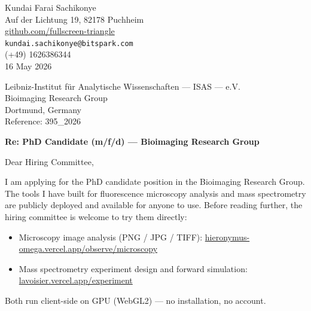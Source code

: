 \documentclass[12pt,a4paper]{article}
\begin{document}
\begin{flushright}
Kundai Farai Sachikonye \\
Auf der Lichtung 19, 82178 Puchheim \\
\href{https://github.com/fullscreen-triangle}{github.com/fullscreen-triangle} \\
\texttt{kundai.sachikonye@bitspark.com} \\
(+49) 1626386344 \\[6pt]
16 May 2026
\end{flushright}

\vspace{1em}

Leibniz-Institut für Analytische Wissenschaften --- ISAS --- e.V. \\
Bioimaging Research Group \\
Dortmund, Germany \\
Reference: 395\_2026

\vspace{1.5em}

\textbf{Re: PhD Candidate (m/f/d) --- Bioimaging Research Group}

\vspace{1em}

Dear Hiring Committee,

I am applying for the PhD candidate position in the Bioimaging Research Group.
The tools I have built for fluorescence microscopy analysis and mass spectrometry
are publicly deployed and available for anyone to use. Before reading further,
the hiring committee is welcome to try them directly:

\begin{itemize}
  \item Microscopy image analysis (PNG / JPG / TIFF):
    \href{https://hieronymus-omega.vercel.app/observe/microscopy}{hieronymus-omega.vercel.app/observe/microscopy}
  \item Mass spectrometry experiment design and forward simulation:
    \href{https://lavoisier.vercel.app/experiment}{lavoisier.vercel.app/experiment}
\end{itemize}

Both run client-side on GPU (WebGL2) --- no installation, no account.
\end{document}
